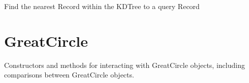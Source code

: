 \documentclass[letterpaper,10pt,english]{sphinxmanual}
\begin{document}
\begin{fulllineitems}
\begin{fulllineitems}
\label{\detokenize{users_guide:GeoSpatialTools.kdtree.KDTree.query}}
\pysigstartsignatures
{}
\pysigstopsignatures
\sphinxAtStartPar
Find the nearest Record within the KDTree to a query Record
\begin{quote}\begin{description}
\sphinxAtStartPar
{}

\end{description}\end{quote}

\end{fulllineitems}


\end{fulllineitems}


\section{GreatCircle}
\label{\detokenize{users_guide:greatcircle}}\label{\detokenize{users_guide:module-GeoSpatialTools.great_circle}}
\sphinxAtStartPar
Constructors and methods for interacting with GreatCircle objects, including
comparisons between GreatCircle objects.
\end{document}
